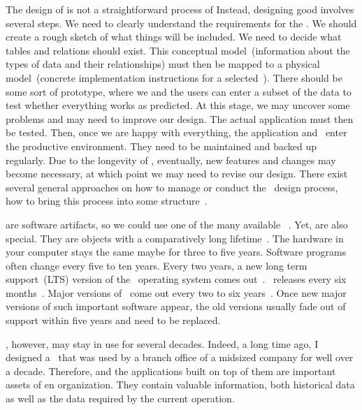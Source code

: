 %
The design of  is not a straightforward process of 
Instead, designing good  involves several steps.
We need to clearly understand the requirements for the \db.
We should create a rough sketch of what things will be included.
We need to decide what tables and relations should exist.
This conceptual model~(information about the types of data and their relationships) must then be mapped to a physical model~(concrete implementation instructions for a selected~\dbms).
There should be some sort of prototype, where we and the users can enter a subset of the data to test whether everything works as predicted.
At this stage, we may uncover some problems and may need to improve our design.
The actual application must then be tested.
Then, once we are happy with everything, the application and \db\ enter the productive environment.
They need to be maintained and backed up regularly.
Due to the longevity of , eventually, new features and changes may become necessary, at which point we may need to revise our design.
There exist several general approaches on how to manage or conduct the \db\ design process, how to bring this process into some structure~\cite{GMTM2011DDLC}.

 are software artifacts, so we could use one of the many available ~\cite{I2018SAH,N2024SEFDS}.
Yet,  are also special.
They are objects with a comparatively long lifetime~\cite{SS2005EIDDDFDB:I}.
The hardware in your computer stays the same maybe for three to five years.
Software programs often change every five to ten years.
Every two years, a new long term support~(LTS) version of the \ubuntu\ operating system comes out~\cite{C2024TULARC}.
\libreoffice\ releases every six months~\cite{DF2024TDFWR}.
Major versions of \microsoftWindows\ come out every two to six years~\cite{EOEBEB:LOWV}.
Once new major versions of such important software appear, the old versions usually fade out of support within five years and need to be replaced.

, however, may stay in use for several decades.
Indeed, a long time ago, I designed a \db\ that was used by a branch office of a midsized company for well over a decade.
Therefore,  and the applications built on top of them are important assets of en organization.
They contain valuable information, both historical data as well as the data required by the current operation.

